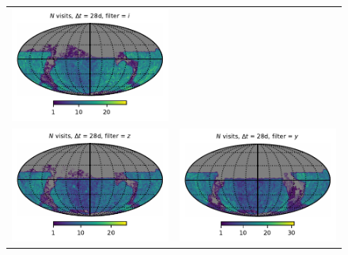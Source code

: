\documentclass[preprintm,linenumbers]{aastex631}
\begin{document}
\begin{figure}
\begin{tabular}{@{}c@{}c@{}}
				\includegraphics{results/skymaps/skymap_first_year_one_snap_v4_0_10yrs_db_noDD_noTwi_tscale-28_nside-256_doAllTemplateMetrics_reduceCount_i_noDD_noTwi.pdf} \\
				\includegraphics{results/skymaps/skymap_first_year_one_snap_v4_0_10yrs_db_noDD_noTwi_tscale-28_nside-256_doAllTemplateMetrics_reduceCount_z_noDD_noTwi.pdf} &
				\includegraphics{results/skymaps/skymap_first_year_one_snap_v4_0_10yrs_db_noDD_noTwi_tscale-28_nside-256_doAllTemplateMetrics_reduceCount_y_noDD_noTwi.pdf} \\

\end{tabular}
\end{figure}
\end{document}
